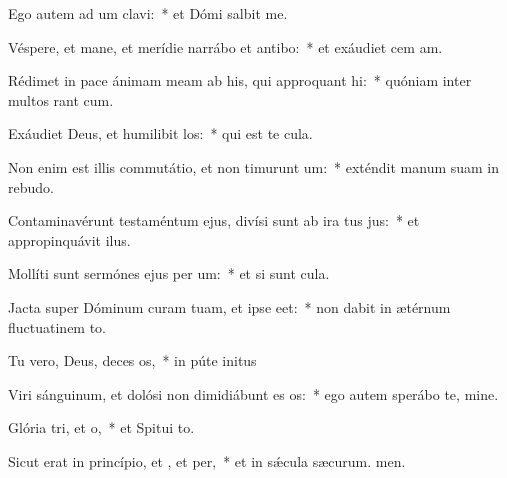 \item Ego autem ad um clavi:~* et Dómi salbit me.
\item Véspere, et mane, et merídie narrábo et antibo:~* et exáudiet cem am.
\item Rédimet in pace ánimam meam ab his, qui approquant hi:~* quóniam inter multos rant cum.
\item Exáudiet Deus, et humilibit los:~* qui est te cula.
\item Non enim est illis commutátio, et non timurunt um:~* exténdit manum suam in rebudo.
\item Contaminavérunt testaméntum ejus, divísi sunt ab ira tus jus:~* et appropinquávit  ilus.
\item Mollíti sunt sermónes ejus per um:~* et si sunt cula.
\item Jacta super Dóminum curam tuam, et ipse  eet:~* non dabit in ætérnum fluctuatinem to.
\item Tu vero, Deus, deces os,~* in púte initus
\item Viri sánguinum, et dolósi non dimidiábunt es os:~* ego autem sperábo  te, mine.
\item Glória tri, et o,~* et Spitui to.
\item Sicut erat in princípio, et , et per,~* et in sǽcula sæcurum. men.
